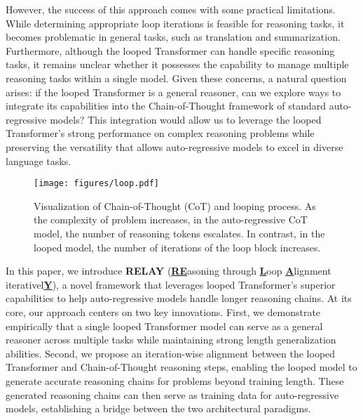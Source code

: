 However, the success of this approach comes with some practical limitations. While determining appropriate loop iterations is feasible for reasoning tasks, it becomes problematic in general tasks, such as translation and summarization. Furthermore, although the looped Transformer can handle specific reasoning tasks, it remains unclear whether it possesses the capability to manage multiple reasoning tasks within a single model. Given these concerns, a natural question arises: if the looped Transformer is a general reasoner, can we explore ways to integrate its capabilities into the Chain-of-Thought framework of standard auto-regressive models? This integration would allow us to leverage the looped Transformer's strong performance on complex reasoning problems while preserving the versatility that allows auto-regressive models to excel in diverse language tasks.

\begin{figure}[t]
    \centering
    \texttt{[image: figures/loop.pdf]}
    \caption{Visualization of Chain-of-Thought (CoT) and looping process. As the complexity of problem increases, in the auto-regressive CoT model, the number of reasoning tokens escalates. In contrast, in the looped model, the number of iterations of the loop block increases. } 
    \label{fig:loop}
    \vspace{-14pt}
\end{figure}

In this paper, we introduce \textbf{RELAY} (\underline{\textbf{RE}}asoning through \underline{\textbf{L}}oop \underline{\textbf{A}}lignment iterativel\underline{\textbf{Y}}), a novel framework that leverages looped Transformer's superior capabilities to help auto-regressive models handle longer reasoning chains. At its core, our approach centers on two key innovations. First, we demonstrate empirically that a single looped Transformer model can serve as a general reasoner across multiple tasks while maintaining strong length generalization abilities. Second, we propose an iteration-wise alignment between the looped Transformer and Chain-of-Thought reasoning steps, enabling the looped model to generate accurate reasoning chains for problems beyond training length. These generated reasoning chains can then serve as training data for auto-regressive models, establishing a bridge between the two architectural paradigms.

